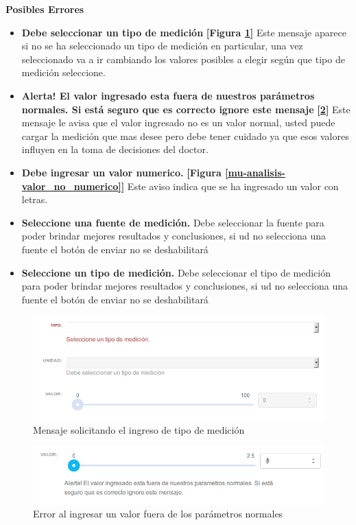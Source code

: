 \begin{itemize}
 	\textbf{Posibles Errores}
 	\begin{itemize}
 		\item \textbf{Debe seleccionar un tipo de medición} \textbf{[Figura \ref{mu-analisis-seleccione_tipo}]} Este mensaje aparece si no se ha seleccionado un tipo de medición en particular, una vez seleccionado va a ir cambiando los valores posibles a elegir según que tipo de medición seleccione.
 		\item \textbf{Alerta! El valor ingresado esta fuera de nuestros parámetros normales. Si está seguro que es correcto ignore este mensaje} \textbf{[\ref{mu-analisis-fuera_de_parametros}]} Este mensaje le avisa que el valor ingresado no es un valor normal, usted puede cargar la medición que mas desee pero debe tener cuidado ya que esos valores influyen en la toma de decisiones del doctor.
 		\item \textbf{Debe ingresar un valor numerico.} \textbf{[Figura \ref{mu-analisis-valor_no_numerico}]} Este aviso indica que se ha ingresado un valor con letras.
 		\item \textbf{Seleccione una fuente de medición.} Debe seleccionar la fuente para poder brindar mejores resultados y conclusiones, si ud no selecciona una fuente el botón de enviar no se deshabilitará
 		\item \textbf{Seleccione un tipo de medición.} Debe seleccionar el tipo de medición para poder brindar mejores resultados y conclusiones, si ud no selecciona una fuente el botón de enviar no se deshabilitará
 	\end{itemize}
 \end{itemize}
 
 \begin{figure}
 	\centering
 	\includegraphics[width=.8\textwidth]{img/manual_de_usuario/seleccione_tipo}
 	\caption{Mensaje solicitando el ingreso de tipo de medición}
 	\label{mu-analisis-seleccione_tipo}
 \end{figure}
 
 
 \begin{figure}
 	\centering
 	\includegraphics[width=.8\textwidth]{img/manual_de_usuario/fuera_de_parametros}
 	\caption{Error al ingresar un valor fuera de los parámetros normales}
 	\label{mu-analisis-fuera_de_parametros}
 \end{figure}
 
